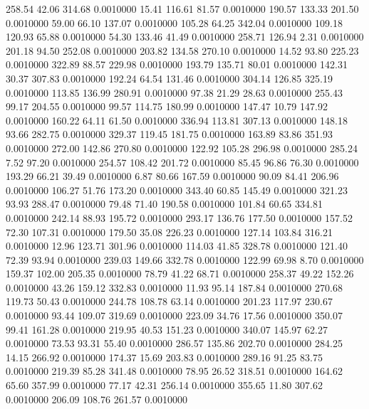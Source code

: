  258.54   42.06  314.68   0.0010000
  15.41  116.61   81.57   0.0010000
 190.57  133.33  201.50   0.0010000
  59.00   66.10  137.07   0.0010000
 105.28   64.25  342.04   0.0010000
 109.18  120.93   65.88   0.0010000
  54.30  133.46   41.49   0.0010000
 258.71  126.94    2.31   0.0010000
 201.18   94.50  252.08   0.0010000
 203.82  134.58  270.10   0.0010000
  14.52   93.80  225.23   0.0010000
 322.89   88.57  229.98   0.0010000
 193.79  135.71   80.01   0.0010000
 142.31   30.37  307.83   0.0010000
 192.24   64.54  131.46   0.0010000
 304.14  126.85  325.19   0.0010000
 113.85  136.99  280.91   0.0010000
  97.38   21.29   28.63   0.0010000
 255.43   99.17  204.55   0.0010000
  99.57  114.75  180.99   0.0010000
 147.47   10.79  147.92   0.0010000
 160.22   64.11   61.50   0.0010000
 336.94  113.81  307.13   0.0010000
 148.18   93.66  282.75   0.0010000
 329.37  119.45  181.75   0.0010000
 163.89   83.86  351.93   0.0010000
 272.00  142.86  270.80   0.0010000
 122.92  105.28  296.98   0.0010000
 285.24    7.52   97.20   0.0010000
 254.57  108.42  201.72   0.0010000
  85.45   96.86   76.30   0.0010000
 193.29   66.21   39.49   0.0010000
   6.87   80.66  167.59   0.0010000
  90.09   84.41  206.96   0.0010000
 106.27   51.76  173.20   0.0010000
 343.40   60.85  145.49   0.0010000
 321.23   93.93  288.47   0.0010000
  79.48   71.40  190.58   0.0010000
 101.84   60.65  334.81   0.0010000
 242.14   88.93  195.72   0.0010000
 293.17  136.76  177.50   0.0010000
 157.52   72.30  107.31   0.0010000
 179.50   35.08  226.23   0.0010000
 127.14  103.84  316.21   0.0010000
  12.96  123.71  301.96   0.0010000
 114.03   41.85  328.78   0.0010000
 121.40   72.39   93.94   0.0010000
 239.03  149.66  332.78   0.0010000
 122.99   69.98    8.70   0.0010000
 159.37  102.00  205.35   0.0010000
  78.79   41.22   68.71   0.0010000
 258.37   49.22  152.26   0.0010000
  43.26  159.12  332.83   0.0010000
  11.93   95.14  187.84   0.0010000
 270.68  119.73   50.43   0.0010000
 244.78  108.78   63.14   0.0010000
 201.23  117.97  230.67   0.0010000
  93.44  109.07  319.69   0.0010000
 223.09   34.76   17.56   0.0010000
 350.07   99.41  161.28   0.0010000
 219.95   40.53  151.23   0.0010000
 340.07  145.97   62.27   0.0010000
  73.53   93.31   55.40   0.0010000
 286.57  135.86  202.70   0.0010000
 284.25   14.15  266.92   0.0010000
 174.37   15.69  203.83   0.0010000
 289.16   91.25   83.75   0.0010000
 219.39   85.28  341.48   0.0010000
  78.95   26.52  318.51   0.0010000
 164.62   65.60  357.99   0.0010000
  77.17   42.31  256.14   0.0010000
 355.65   11.80  307.62   0.0010000
 206.09  108.76  261.57   0.0010000
